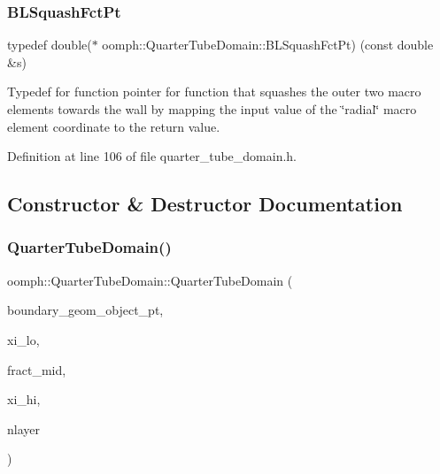 \subsubsection{\texorpdfstring{B\+L\+Squash\+Fct\+Pt}{BLSquashFctPt}}
{\footnotesize\ttfamily typedef double($\ast$ oomph\+::\+Quarter\+Tube\+Domain\+::\+B\+L\+Squash\+Fct\+Pt) (const double \&s)}



Typedef for function pointer for function that squashes the outer two macro elements towards the wall by mapping the input value of the \char`\"{}radial\char`\"{} macro element coordinate to the return value. 



Definition at line 106 of file quarter\+\_\+tube\+\_\+domain.\+h.



\subsection{Constructor \& Destructor Documentation}
\mbox{\label{classoomph_1_1QuarterTubeDomain_a51cea676b1cdf56cc3f1ff5fbec952f8}} 
\subsubsection{\texorpdfstring{Quarter\+Tube\+Domain()}{QuarterTubeDomain()}\hspace{0.1cm}{\footnotesize\ttfamily [1/2]}}
{\footnotesize\ttfamily oomph\+::\+Quarter\+Tube\+Domain\+::\+Quarter\+Tube\+Domain (\begin{DoxyParamCaption}\item[{Geom\+Object $\ast$}]{boundary\+\_\+geom\+\_\+object\+\_\+pt,  }\item[{const Vector$<$ double $>$ \&}]{xi\+\_\+lo,  }\item[{const double \&}]{fract\+\_\+mid,  }\item[{const Vector$<$ double $>$ \&}]{xi\+\_\+hi,  }\item[{const unsigned \&}]{nlayer }\end{DoxyParamCaption})\hspace{0.3cm}{\ttfamily [inline]}}



